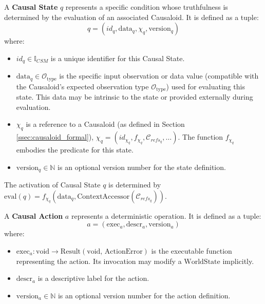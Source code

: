 \begin{definition}
\label{def:csm_state}  
A \textbf{Causal State} \(q\) represents a specific condition whose truthfulness is determined by the evaluation of an associated Causaloid. It is defined as a tuple:
\[ q = (id_q, \text{data}_q, \chi_q, \text{version}_q) \]
where:
\begin{itemize}
    \item \( id_q \in \mathbb{I}_{CSM} \) is a unique identifier for this Causal State.
    \item \( \text{data}_q \in \mathcal{O}_{\text{type}} \) is the specific input observation or data value (compatible with the Causaloid's expected observation type \(\mathcal{O}_{\text{type}}\)) used for evaluating this state. This data may be intrinsic to the state or provided externally during evaluation.
    \item \( \chi_q \) is a reference to a Causaloid (as defined in Section \ref{ssec:causaloid_formal}), \( \chi_q = (id_{\chi_q}, f_{\chi_q}, \mathcal{C}_{refs_q}, \dots) \). The function \(f_{\chi_q}\) embodies the predicate for this state.
    \item \( \text{version}_q \in \mathbb{N} \) is an optional version number for the state definition.
\end{itemize}
\end{definition}  
 
The activation of Causal State \(q\) is determined by \( \text{eval}(q) = f_{\chi_q}(\text{data}_q, \text{ContextAccessor}(\mathcal{C}_{refs_q})) \).

\begin{definition}
\label{def:csm_action}  
A \textbf{Causal Action} \(a\) represents a deterministic operation. It is defined as a tuple:
\[ a = (\text{exec}_a, \text{descr}_a, \text{version}_a) \]
where:
\begin{itemize}
    \item \( \text{exec}_a: \text{void} \to \text{Result}(\text{void, ActionError}) \) is the executable function representing the action. Its invocation may modify a \(\text{WorldState}\) implicitly.
    \item \( \text{descr}_a \) is a descriptive label for the action.
    \item \( \text{version}_a \in \mathbb{N} \) is an optional version number for the action definition.
\end{itemize}
\end{definition}  



